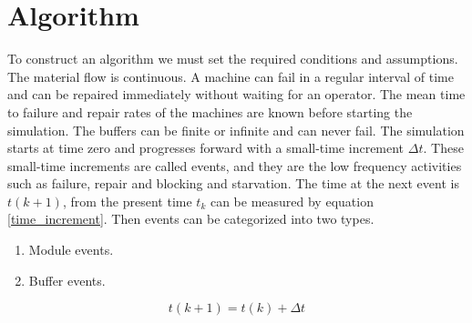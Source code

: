 \section{Algorithm}
To construct an algorithm we must set the required conditions and assumptions.
The material flow is continuous. 
A machine can fail in a regular interval of time and can be repaired immediately without waiting for an operator. The mean time to failure and repair rates of the machines are known before starting the simulation.
The buffers can be finite or infinite and can never fail. 
The simulation starts at time zero and progresses forward with a small-time increment $\Delta t$. These small-time increments are called events, and they are the low frequency activities such as failure, repair and blocking and starvation. The time at the next event is $t(k + 1)$, from the present time $t_{k}$ can be measured by equation \ref{time_increment}. Then events can be categorized into two types.
\begin{enumerate}
    \item Module events.
    \item Buffer events.
\end{enumerate}

\begin{equation} \label{time_increment}
    t(k+1) = t(k) + \Delta t
\end{equation} 


